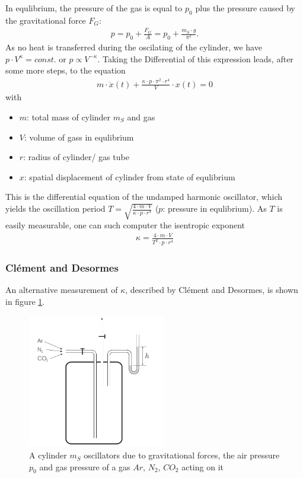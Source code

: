 \documentclass{subfiles}
\begin{document}
            \noindent In equlibrium, the pressure of the gas is equal to $p_0$ plus the pressure caused by the gravitational force $F_G$:
            \begin{align*}
                p=p_0+\frac{F_G}{A}=p_0+\frac{m_S\cdot g}{\pi^2}.
            \end{align*}
            As no heat is transferred during the oscilating of the cylinder, we have $p\cdot V^{\kappa}=const.$ or $p\propto V^{-\kappa}$. Taking the Differential of this expression leads, after some more steps, to the equation 
            \begin{align*}
                m\cdot \ddot x(t)+\frac{\kappa\cdot p\cdot \pi^2\cdot r^4}{V}\cdot x(t)=0
            \end{align*} 
            with
            \begin{itemize}
                \item $m$: total mass of cylinder $m_S$ and gas
                \item $V$: volume of gass in equlibrium
                \item $r$: radius of cylinder/ gas tube
                \item $x$: spatial displacement of cylinder from state of equlibrium
            \end{itemize}
            This is the differential equation of the undamped harmonic oscillator, which yields the oscillation period $T=\sqrt{\frac{4\cdot m\cdot V}{\kappa\cdot p\cdot r^4}}$ ($p$: pressure in equlibrium). As $T$ is easily measurable, one can such computer the isentropic exponent \cite[p.259-262]{skript}
            \begin{align*}
                \kappa=\frac{4\cdot m\cdot V}{T^2\cdot p\cdot r^4}
            \end{align*}

        \subsubsection*{Clément and Desormes}
            An alternative measurement of $\kappa$, described by Clément and Desormes, is shown in figure \ref{fig:ClementDesormes}.
            
            \begin{figure}[H]
                \centering
                \includegraphics[width=6cm]{Bilddateien/Grundlagen/IsentropicClementDesormes.png}
                \caption{A cylinder $m_S$ oscillators due to gravitational forces, the air pressure $p_0$ and gas pressure of a gas $Ar$, $N_2$, $CO_2$ acting on it}
                \label{fig:ClementDesormes}
            \end{figure}
\end{document}
